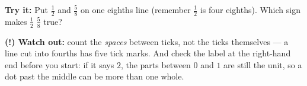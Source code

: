 \documentclass[12pt]{article}
\begin{document}
\begin{tryitbox}
\textbf{Try it:} Put $\frac{1}{2}$ and $\frac{5}{8}$ on one eighths line
(remember $\frac{1}{2}$ is four eighths). Which sign makes
$\frac{1}{2}$ \underline{\hspace{0.9cm}} $\frac{5}{8}$ true?\\[2pt]
\end{tryitbox}

\begin{watchoutbox}
\textbf{(!) Watch out:} count the \emph{spaces} between ticks, not the ticks
themselves --- a line cut into fourths has five tick marks. And check the label
at the right-hand end before you start: if it says $2$, the parts between $0$
and $1$ are still the unit, so a dot past the middle can be more than one
whole.
\end{watchoutbox}
\end{document}
